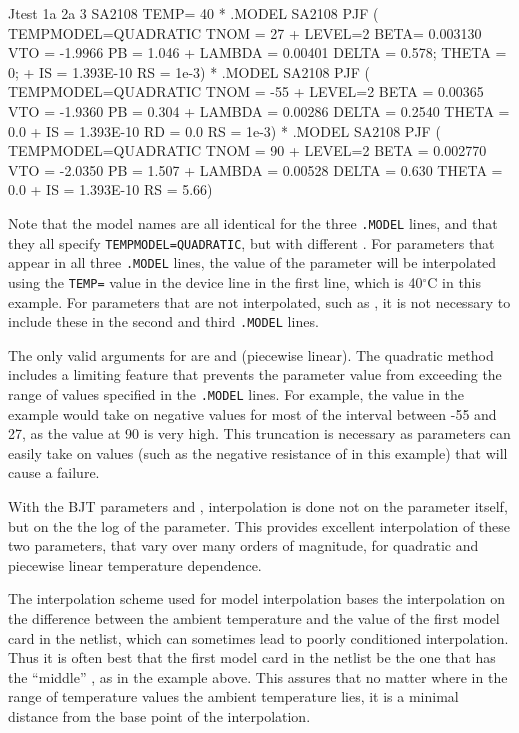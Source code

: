 \begin{vquote}
Jtest 1a 2a 3 SA2108 TEMP= 40
*
.MODEL SA2108 PJF ( TEMPMODEL=QUADRATIC TNOM = 27
+ LEVEL=2 BETA= 0.003130 VTO = -1.9966 PB = 1.046
+ LAMBDA = 0.00401 DELTA = 0.578; THETA = 0;
+ IS = 1.393E-10          RS = 1e-3)
*
.MODEL SA2108 PJF ( TEMPMODEL=QUADRATIC TNOM = -55
+ LEVEL=2 BETA = 0.00365 VTO = -1.9360 PB = 0.304
+ LAMBDA = 0.00286 DELTA = 0.2540 THETA = 0.0
+ IS = 1.393E-10 RD = 0.0 RS = 1e-3)
* 
.MODEL SA2108 PJF ( TEMPMODEL=QUADRATIC TNOM = 90
+ LEVEL=2 BETA = 0.002770 VTO = -2.0350 PB = 1.507
+ LAMBDA = 0.00528 DELTA = 0.630 THETA = 0.0
+ IS = 1.393E-10          RS = 5.66)
\end{vquote}

Note that the model names are all identical for the three \texttt{.MODEL} lines,
and that they all specify \texttt{TEMPMODEL=QUADRATIC}, but with different
.  For parameters that appear in all three \texttt{.MODEL} lines,
the value of the parameter will be interpolated using the \texttt{TEMP=} value
in the device line in the first line, which is 40$^\circ$C in this example.
For parameters that are not interpolated, such as , it is not
necessary to include these in the second and third \texttt{.MODEL} lines.

The only valid arguments for  are  and
 (piecewise linear).  The quadratic method includes a limiting
feature that prevents the parameter value from exceeding the range of values
specified in the \texttt{.MODEL} lines.  For example, the  value in
the example would take on negative values for most of the interval between -55
and 27, as the value at 90 is very high.  This truncation is necessary as
parameters can easily take on values (such as the negative resistance of
 in this example) that will cause a \Xyce{} failure.

With the BJT parameters  and , interpolation is done
not on the parameter itself, but on the the log of the parameter.  This
provides excellent interpolation of these two parameters, that vary over
many orders of magnitude, for quadratic and piecewise linear
temperature dependence.

The interpolation scheme used for model interpolation bases the interpolation
on the difference between the ambient temperature and the  value
of the first model card in the netlist, which can sometimes lead to poorly
conditioned interpolation.  Thus it is often best that the first model card in
the netlist be the one that has the ``middle'' , as in the example
above.  This assures that no matter where in the range of temperature values
the ambient temperature lies, it is a minimal distance from the base point of
the interpolation.


